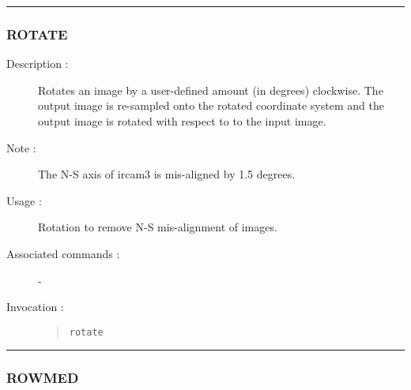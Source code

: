 \hrule 
\subsubsection*{\label{ROTATE}ROTATE}

\begin{description}

\item[Description :] Rotates an image by a user-defined amount (in
degrees) clockwise. The output image is re-sampled onto the rotated
coordinate system and the output image is rotated with respect to to
the input image.

\item[Note :] The N-S axis of {\sc ircam3} is mis-aligned by 1.5 degrees.

\item[Usage :] Rotation to remove N-S mis-alignment of images.
\item[Associated commands :] -
\item[Invocation :]

\begin{quote}{\tt  rotate }\end{quote}

\end{description}

\hrule 
\subsubsection*{\label{ROWMED}ROWMED}


